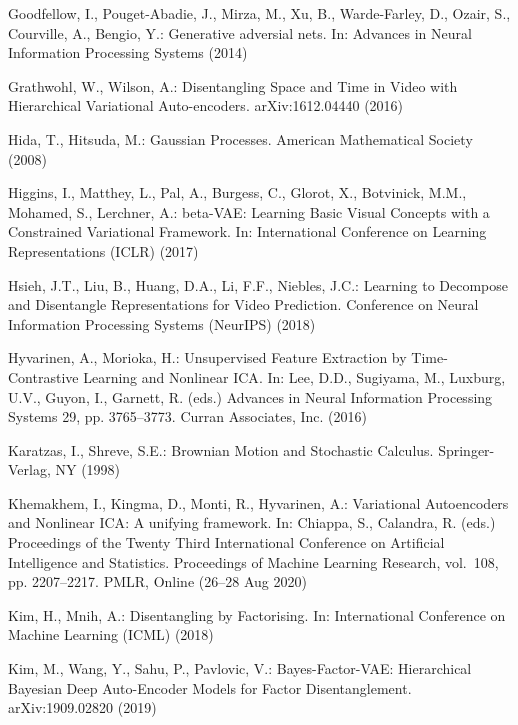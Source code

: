 \documentclass[runningheads]{llncs}
\begin{document}
\begin{thebibliography}{10}
	Goodfellow, I., Pouget-Abadie, J., Mirza, M., Xu, B., Warde-Farley, D., Ozair,
	S., Courville, A., Bengio, Y.: Generative adversial nets. In: Advances in
	Neural Information Processing Systems (2014)
	
	Grathwohl, W., Wilson, A.: Disentangling {S}pace and {T}ime in {V}ideo with
	{H}ierarchical {V}ariational {A}uto-encoders. arXiv:1612.04440  (2016)
	
	Hida, T., Hitsuda, M.: Gaussian {P}rocesses. American Mathematical Society
	(2008)
	
	Higgins, I., Matthey, L., Pal, A., Burgess, C., Glorot, X., Botvinick, M.M.,
	Mohamed, S., Lerchner, A.: beta-{V}{A}{E}: {L}earning {B}asic {V}isual
	{C}oncepts with a {C}onstrained {V}ariational {F}ramework. In: International
	Conference on Learning Representations (ICLR) (2017)
	
	Hsieh, J.T., Liu, B., Huang, D.A., Li, F.F., Niebles, J.C.: Learning to
	{D}ecompose and {D}isentangle {R}epresentations for {V}ideo {P}rediction.
	Conference on Neural Information Processing Systems (NeurIPS)  (2018)
	
	Hyvarinen, A., Morioka, H.: Unsupervised {F}eature {E}xtraction by
	{T}ime-{C}ontrastive {L}earning and {N}onlinear {ICA}. In: Lee, D.D.,
	Sugiyama, M., Luxburg, U.V., Guyon, I., Garnett, R. (eds.) Advances in Neural
	Information Processing Systems 29, pp. 3765--3773. Curran Associates, Inc.
	(2016)
	
	Karatzas, I., Shreve, S.E.: Brownian {M}otion and {S}tochastic {C}alculus.
	Springer-Verlag, NY (1998)
	
	Khemakhem, I., Kingma, D., Monti, R., Hyvarinen, A.: Variational {A}utoencoders
	and {N}onlinear {ICA}: A unifying framework. In: Chiappa, S., Calandra, R.
	(eds.) Proceedings of the Twenty Third International Conference on Artificial
	Intelligence and Statistics. Proceedings of Machine Learning Research,
	vol.~108, pp. 2207--2217. PMLR, Online (26--28 Aug 2020)
	
	Kim, H., Mnih, A.: Disentangling by {F}actorising. In: International Conference
	on Machine Learning (ICML) (2018)
	
	Kim, M., Wang, Y., Sahu, P., Pavlovic, V.: Bayes-{F}actor-{V}{A}{E}:
	{H}ierarchical {B}ayesian {D}eep {A}uto-{E}ncoder {M}odels for {F}actor
	{D}isentanglement. arXiv:1909.02820  (2019)
	

\end{thebibliography}
\end{document}
